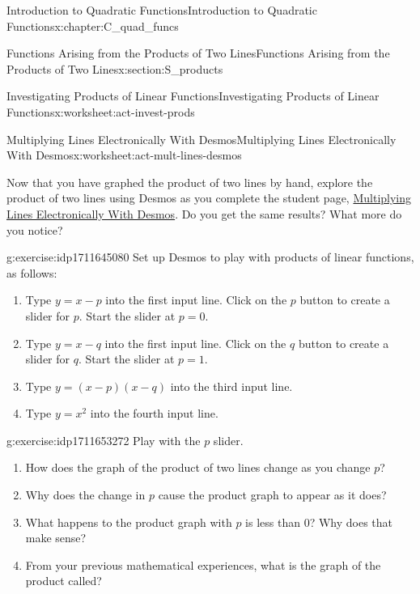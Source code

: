 \documentclass[oneside,10pt,]{book}
\numberwithin{equation}{chapter}
\begin{document}
\begin{chapterptx}{Introduction to Quadratic Functions}{}{Introduction to Quadratic Functions}{}{}{x:chapter:C_quad_funcs}
\begin{sectionptx}{Functions Arising from the Products of Two Lines}{}{Functions Arising from the Products of Two Lines}{}{}{x:section:S_products}
\begin{worksheet-subsection}{Investigating Products of Linear Functions}{}{Investigating Products of Linear Functions}{}{}{x:worksheet:act-invest-prods}
\end{worksheet-subsection}
\restoregeometry
%
%
\typeout{************************************************}
\typeout{************************************************}
%
\begin{worksheet-subsection}{Multiplying Lines Electronically With Desmos}{}{Multiplying Lines Electronically With Desmos}{}{}{x:worksheet:act-mult-lines-desmos}
\begin{introduction}{}%
Now that you have graphed the product of two lines by hand, explore the product of two lines using Desmos as you complete the student page, \hyperref[x:worksheet:act-mult-lines-desmos]{Multiplying Lines Electronically With Desmos}. Do you get the same results? What more do you notice?%
\end{introduction}%
\begin{divisionexercise}{1}{}{}{g:exercise:idp1711645080}%
Set up Desmos to play with products of linear functions, as follows:%
\begin{enumerate}[font=\bfseries,label=(\alph*),ref=\alph*]
\item{}Type \(y = x - p\) into the first input line. Click on the \(p\) button to create a slider for \(p\). Start the slider at \(p = 0\).%
\item{}Type \(y = x - q\) into the first input line. Click on the \(q\) button to create a slider for \(q\). Start the slider at \(p = 1\).%
\item{}Type \(y = (x - p)(x - q)\) into the third input line.%
\item{}Type \(y = x^2\) into the fourth input line.%
\end{enumerate}
\end{divisionexercise}%
\begin{divisionexercise}{2}{}{}{g:exercise:idp1711653272}%
Play with the \(p\) slider.%
\begin{enumerate}[font=\bfseries,label=(\alph*),ref=\alph*]
\item{}How does the graph of the product of two lines change as you change \(p\)?%
\item{}Why does the change in \(p\) cause the product graph to appear as it does?%
\item{}What happens to the product graph with \(p\) is less than 0? Why does that make sense?%
\item{}From your previous mathematical experiences, what is the graph of the product called?%

\end{enumerate}
\end{divisionexercise}
\end{worksheet-subsection}
\end{sectionptx}
\end{chapterptx}
\end{document}
